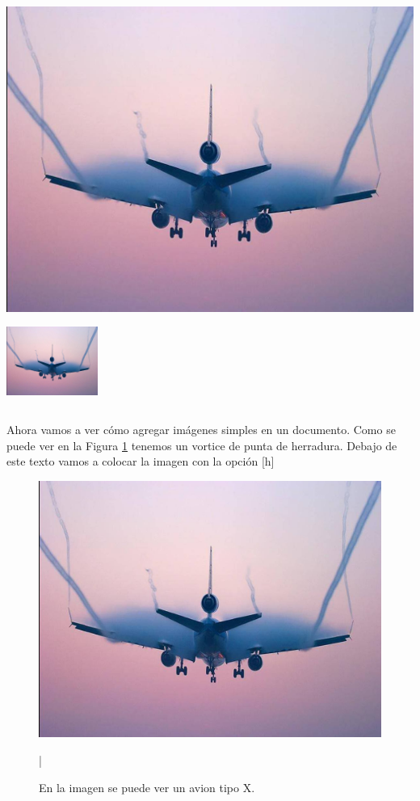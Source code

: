 \documentclass{report}
\begin{document}
\listoffigures
\pagebreak

\includegraphics[scale=.3]{img/arre}
\includegraphics[width=3cm, height=3cm, angle=50]{arre}

Ahora vamos a ver cómo agregar imágenes simples en un documento. Como se puede ver en la Figura \ref{fig:avion} tenemos un vortice de punta de herradura. Debajo de este texto vamos a colocar la imagen con la opción [h]

%
\begin{figure}[h]
	\centering
	\includegraphics[scale=.4]{img/arre}
	\caption{En la imagen se puede ver un avion tipo X.}|
	\label{fig:avion}
\end{figure}
\end{document}
